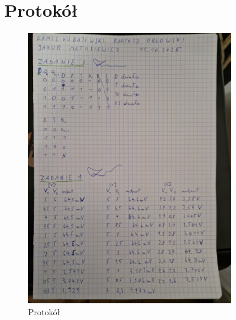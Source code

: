 \documentclass{article}
\begin{document}
\pagebreak
\section{Protokół}

\begin{figure}[h]
    \centering
    \includegraphics[width=0.8\textwidth, angle=-90]{protokol.JPG}
    \caption{Protokół}
    \label{fig:moj_obrazek}
\end{figure}
\end{document}
